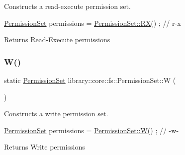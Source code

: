 Constructs a read-\/execute permission set. 


\begin{DoxyCode}
\hyperlink{classlibrary_1_1core_1_1fs_1_1_permission_set_a8a6eb39cc2a8bca92a657d065d3e36ba}{PermissionSet} permissions = \hyperlink{classlibrary_1_1core_1_1fs_1_1_permission_set_ab632d79f1b8b8f4577bc06fa622b1c09}{PermissionSet::RX}() ; \textcolor{comment}{// r-x}
\end{DoxyCode}


\begin{DoxyReturn}{Returns}
Read-\/\+Execute permissions 
\end{DoxyReturn}
\mbox{\label{classlibrary_1_1core_1_1fs_1_1_permission_set_a7046fb1ae54d0308161a44eaf01b03e1}} 
\subsubsection{\texorpdfstring{W()}{W()}}
{\footnotesize\ttfamily static \hyperlink{classlibrary_1_1core_1_1fs_1_1_permission_set}{Permission\+Set} library\+::core\+::fs\+::\+Permission\+Set\+::W (\begin{DoxyParamCaption}{ }\end{DoxyParamCaption})\hspace{0.3cm}{\ttfamily [static]}}



Constructs a write permission set. 


\begin{DoxyCode}
\hyperlink{classlibrary_1_1core_1_1fs_1_1_permission_set_a8a6eb39cc2a8bca92a657d065d3e36ba}{PermissionSet} permissions = \hyperlink{classlibrary_1_1core_1_1fs_1_1_permission_set_a7046fb1ae54d0308161a44eaf01b03e1}{PermissionSet::W}() ; \textcolor{comment}{// -w-}
\end{DoxyCode}


\begin{DoxyReturn}{Returns}
Write permissions 
\end{DoxyReturn}
\mbox{\label{classlibrary_1_1core_1_1fs_1_1_permission_set_a7f4717643d0b80b0b98104c357b3322f}} 

